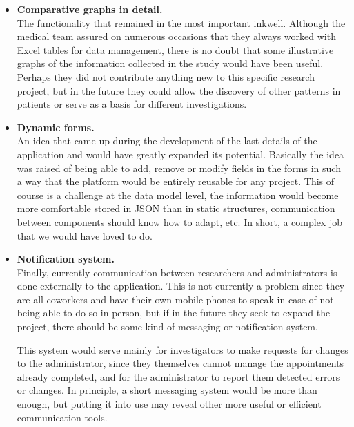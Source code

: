  \begin{itemize}
  \item\textbf{Comparative graphs in detail.} \\
The functionality that remained in the most important inkwell. Although the medical team assured on numerous occasions that they always worked with Excel tables for data management, there is no doubt that some illustrative graphs of the information collected in the study would have been useful. Perhaps they did not contribute anything new to this specific research project, but in the future they could allow the discovery of other patterns in patients or serve as a basis for different investigations. \\
  
  \item\textbf{Dynamic forms.} \\
  An idea that came up during the development of the last details of the application and would have greatly expanded its potential. Basically the idea was raised of being able to add, remove or modify fields in the forms in such a way that the platform would be entirely reusable for any project. This of course is a challenge at the data model level, the information would become more comfortable stored in JSON than in static structures, communication between components should know how to adapt, etc. In short, a complex job that we would have loved to do. \\
  
  \item\textbf{Notification system.} \\
  Finally, currently communication between researchers and administrators is done externally to the application. This is not currently a problem since they are all coworkers and have their own mobile phones to speak in case of not being able to do so in person, but if in the future they seek to expand the project, there should be some kind of messaging or notification system.
  \newline
  
  This system would serve mainly for investigators to make requests for changes to the administrator, since they themselves cannot manage the appointments already completed, and for the administrator to report them detected errors or changes. In principle, a short messaging system would be more than enough, but putting it into use may reveal other more useful or efficient communication tools. \\

\end{itemize}
    
    
    
    
    
    